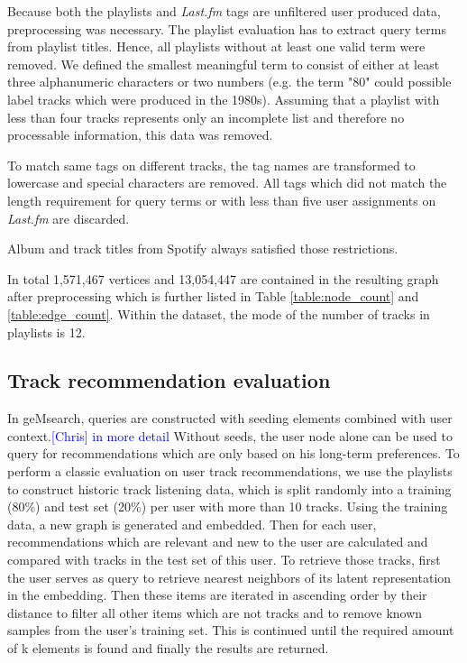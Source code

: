 \documentclass[sigconf]{acmart}
\newcommand{\ce}[1]{\textcolor{blue}{[Chris] #1}}
\newcommand{\ce}[1]{}
\begin{document}
Because both the playlists and \emph{Last.fm} tags are unfiltered user produced data, preprocessing was necessary. The playlist evaluation has to extract query terms from playlist titles. Hence, all playlists without at least one valid term were removed. We defined the smallest meaningful term to consist of either at least three alphanumeric characters or two numbers (e.g. the term "80" could possible label tracks which were produced in the 1980s). Assuming that a playlist with less than four tracks represents only an incomplete list and therefore no processable information, this data was removed.
 
To match same tags on different tracks, the tag names are transformed to lowercase and special characters are removed. All tags which did not match the length requirement for query terms or with less than five user assignments on \emph{Last.fm} are discarded.
 
Album and track titles from Spotify always satisfied those restrictions.


In total 1,571,467 vertices and 13,054,447 are contained in the resulting graph after preprocessing which is further listed in Table \ref{table:node_count} and \ref{table:edge_count}. Within the dataset, the mode of the number of tracks in playlists is 12.

\subsection{Track recommendation evaluation}
\label{subsec:track_rec_eval}
In geMsearch, queries are constructed with seeding elements combined with user context.\ce{in more detail} Without seeds, the user node alone can be used to query for recommendations which are only based on his long-term preferences. To perform a classic evaluation on user track recommendations, we use the playlists to construct historic track listening data, which is split randomly into a training (80\%) and test set (20\%) per user with more than 10 tracks. Using the training data, a new graph is generated and embedded. Then for each user, recommendations which are relevant and new to the user are calculated and compared with tracks in the test set of this user. 
To retrieve those tracks, first the user serves as query to retrieve nearest neighbors of its latent representation in the embedding. Then these items are iterated in ascending order by their distance to filter all other items which are not tracks and to remove known samples from the user's training set. This is continued until the required amount of k elements is found and finally the results are returned.
\end{document}

